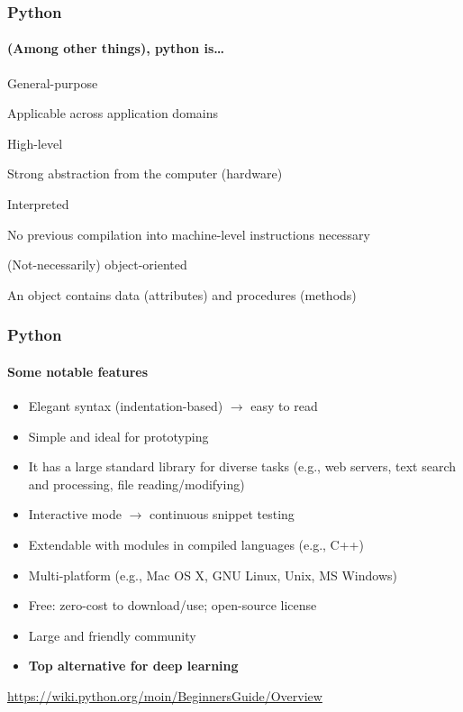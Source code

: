 \documentclass{beamer}
\newcommand{\light}[1]{\textcolor{gray}{#1}}
\begin{document}
\begin{frame}
\frametitle{Python}
\framesubtitle{(Among other things), python is\ldots}

\alert{General-purpose}

Applicable across application domains
\bigskip 	\pause

\alert{High-level}

Strong abstraction from the computer (hardware)
\bigskip 	\pause

\alert{Interpreted}

No previous compilation into machine-level instructions necessary
\bigskip 	\pause

\alert{(Not-necessarily) object-oriented}

An object contains data (attributes) and procedures (methods)
\end{frame}

\begin{frame}
\frametitle{Python}
\framesubtitle{Some notable features}



\begin{itemize}
\item Elegant syntax (indentation-based) $\rightarrow$ easy to read	\pause 
\item Simple and ideal for prototyping	\pause 
\item It has a large standard library for diverse tasks (e.g., web servers, 
text search and processing, file reading/modifying)	\pause 
\item Interactive mode $\rightarrow$ continuous snippet testing	\pause 
\item Extendable with modules in compiled languages (e.g., C++)	\pause 
\item Multi-platform (e.g., Mac OS X, GNU Linux, Unix, MS Windows)	\pause 
\item Free: zero-cost to download/use; open-source license	\pause 
\item Large and friendly community		\pause 
\item \textbf{Top alternative for deep learning}
\end{itemize}
\bigskip 

\onslide 
\light{\url{https://wiki.python.org/moin/BeginnersGuide/Overview}}
\end{frame}
\end{document}
